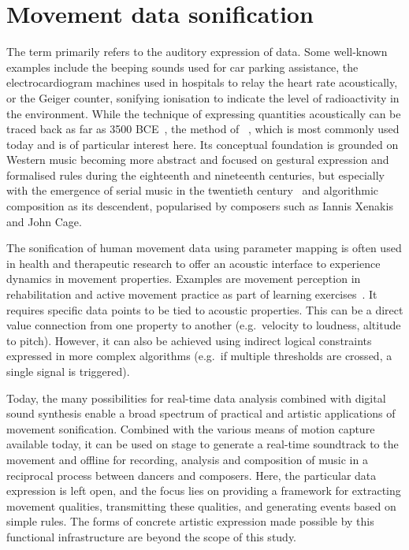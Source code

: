 \section{Movement data sonification}
\label{sec:movement-data-sonification}

The term  primarily refers to the auditory expression of data.
Some well-known examples include the beeping sounds used for car parking assistance, the electrocardiogram machines used in hospitals to relay the heart rate acoustically, or the Geiger counter, sonifying ionisation to indicate the level of radioactivity in the environment.
While the technique of expressing quantities acoustically can be traced back as far as 3500 BCE~\parencite[178]{sonificationPreHistory}, the method of ~\parencite[Chapter~15]{sonificationHandbook}, which is most commonly used today and is of particular interest here.
Its conceptual foundation is grounded on Western music becoming more abstract and focused on gestural expression and formalised rules during the eighteenth and nineteenth centuries, but especially with the emergence of serial music in the twentieth century~\parencite[179-180]{sonificationPreHistory} and algorithmic composition as its descendent, popularised by composers such as Iannis Xenakis and John Cage.

The sonification of human movement data using parameter mapping is often used in health and therapeutic research to offer an acoustic interface to experience dynamics in movement properties.
Examples are movement perception in rehabilitation and active movement practice as part of learning exercises~\parencite[see][]{ifMotionSounds}.
It requires specific data points to be tied to acoustic properties.
This can be a direct value connection from one property to another (e.g.\ velocity to loudness, altitude to pitch).
However, it can also be achieved using indirect logical constraints expressed in more complex algorithms (e.g.\ if multiple thresholds are crossed, a single signal is triggered).

Today, the many possibilities for real-time data analysis combined with digital sound synthesis enable a broad spectrum of practical and artistic applications of movement sonification.
Combined with the various means of motion capture available today, it can be used on stage to generate a real-time soundtrack to the movement and offline for recording, analysis and composition of music in a reciprocal process between dancers and composers.
Here, the particular data expression is left open, and the focus lies on providing a framework for extracting movement qualities, transmitting these qualities, and generating events based on simple rules.
The forms of concrete artistic expression made possible by this functional infrastructure are beyond the scope of this study.

